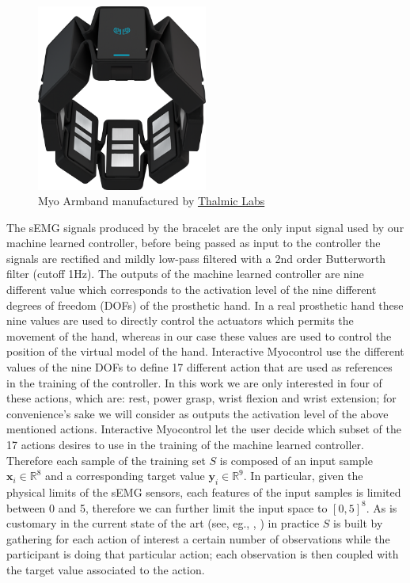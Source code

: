\begin{figure}[ht]
    \centering
    \includegraphics[width=0.5\textwidth]{Images/myo_armband.png}
    \caption{Myo Armband manufactured by \href{https://www.myo.com/techspecs}{Thalmic Labs}}
    \label{fig:myo_armband}
\end{figure}
The sEMG signals produced by the bracelet are the only input signal used by our machine learned controller, before being passed as input to the controller the signals are rectified and mildly low-pass filtered with a 2nd order Butterworth filter (cutoff 1Hz).
The outputs of the machine learned controller are nine different value which corresponds to the activation level of the nine different degrees of freedom (DOFs) of the prosthetic hand. In a real prosthetic hand these nine values are used to directly control the actuators which permits the movement of the hand, whereas in our case these values are used to control the position of the virtual model of the hand. Interactive Myocontrol use the different values of the nine DOFs to define 17 different action that are used as references in the training of the controller. In this work we are only interested in four of these actions, which are: rest, power grasp, wrist flexion and wrist extension; for convenience's sake we will consider as outputs the activation level of the above mentioned actions.
Interactive Myocontrol let the user decide which subset of the 17 actions desires to use in the training of the machine learned controller.
Therefore each sample of the training set $S$ is composed of an input sample $\mathbf{x}_i \in \mathbb{R}^8$ and a corresponding target value $\mathbf{y}_i \in \mathbb{R}^9$. In particular, given the physical limits of the sEMG sensors, each features of the input samples is limited between 0 and 5, therefore we can further limit the input space to $[0, 5]^8$.
As is customary in the current state of the art (see, eg., \cite{hahne2015concurrent}, \cite{sierra2013realistic}) in practice $S$ is built by gathering for each action of interest a certain number of observations while the participant is doing that particular action; each observation is then coupled with the target value associated to the action.
